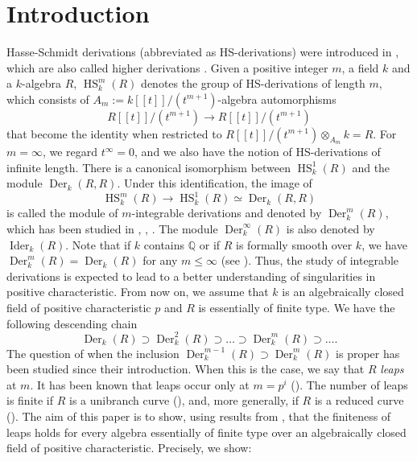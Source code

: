\documentclass{amsart}
\newcommand{\HS}{\operatorname{HS}}
\begin{document}
\section{Introduction}
Hasse-Schmidt derivations (abbreviated as HS-derivations) were introduced in \cite{SchmidtHasse+1937+215+237}, which are also called higher derivations \cite[\S 27]{Mat}. Given a positive integer $m$, a field $k$ and a $k$-algebra $R$, $\HS _k^m(R)$ denotes the group of HS-derivations of length $m$, which consists of $A_m:=k[\![t]\!]/(t^{m+1})$-algebra automorphisms
$$R[\![t]\!]/(t^{m+1}) \to R[\![t]\!]/(t^{m+1})$$
that become the identity when restricted to $ R[\![t]\!]/(t^{m+1}) \otimes_{A_m} k=R$. For $m=\infty$, we regard $t^\infty=0$, and we also have the notion of HS-derivations of infinite length. There is a canonical isomorphism between $\HS _k^1(R)$ and the module $\operatorname{Der}_k(R,R)$. Under this identification, the image of
$$\HS _k^m(R)\to \HS _k^1(R)\simeq \operatorname{Der}_k(R,R)$$
is called the module of $m$-integrable derivations and denoted by $\operatorname{Der}_k^m(R)$, which has been studied in \cite{matsumura1982integrable}, \cite{NARVAEZMACARRO20122712}, \cite{NARVAEZMACARRO2024109758}. The module $\operatorname{Der}_k^\infty(R)$ is also denoted by $\operatorname{Ider}_k(R)$. Note that if $k$ contains $\mathbb{Q}$ or if $R$ is formally smooth over $k$, we have $\operatorname{Der}_k^m(R)=\operatorname{Der}_k(R)$ for any $m\le \infty$ (see \cite{Mat}). Thus, the study of integrable derivations is expected to lead to a better understanding of singularities in positive characteristic. From now on, we assume that $k$ is an algebraically closed field of positive characteristic $p$ and $R$ is essentially of finite type. We have the following descending chain
$$ \operatorname{Der}_k(R)\supset \operatorname{Der}_k^2(R)\supset \dots \supset \operatorname{Der}_k^m(R) \supset\dots.$$
The question of when the inclusion $\operatorname{Der}_k^{m-1}(R)\supset \operatorname{Der}_k^m(R)$ is proper has been studied since their introduction. When this is the case, we say that $R$ {\em leaps} at $m$. It has been known that leaps occur only at $m=p^i$ (\cite[Theorem 4.1]{Her}). The number of leaps is finite if $R$ is a unibranch curve (\cite[Theorem 4.7]{NARVAEZMACARRO2024109441}), and, more generally, if $R$ is a reduced curve (\cite[Theorem 6.1, Corollary 6.3]{bravo2024finitenessleapssensehasseschmidt}).
The aim of this paper is to show, using results from \cite[\S 2]{miy2025}, that the finiteness of leaps holds for every algebra essentially of finite type over an algebraically closed field of positive characteristic. Precisely, we show:
\end{document}
